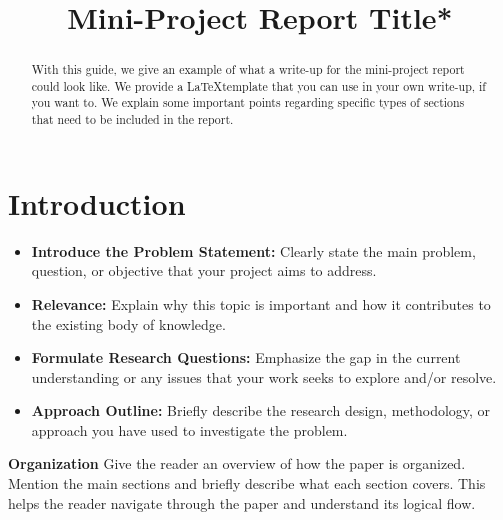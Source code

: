 \documentclass[conference]{IEEEtran}
\begin{document}
\title{Mini-Project Report Title*}

\author{
\and
{}
\and
{}
\and
{}
\and
{}
}

\maketitle

\begin{abstract}
With this guide, we give an example of what a write-up for the mini-project report could look like. We provide a \LaTeX template that you 
can use in your own write-up, if you want to. We explain some important points regarding specific types of sections that need to be included in the report.
\end{abstract}


\section{Introduction}
\begin{itemize}
	\item \textbf{Introduce the Problem Statement:} Clearly state the main  problem, question, or objective that your project aims to address.
	\item \textbf{Relevance:} Explain why this topic is important and how it contributes to the existing body of knowledge.
	\item \textbf{Formulate Research Questions:} Emphasize the gap in the current understanding or any issues that your work seeks to explore and/or resolve.
	\item \textbf{Approach Outline:} Briefly describe the research design, methodology, or approach you have used to investigate the problem. 
\end{itemize}
\textbf{Organization} Give the reader an overview of how the paper is organized. Mention the main sections and briefly describe what each section covers. This helps the reader navigate through the paper and understand its logical flow.
\end{document}
